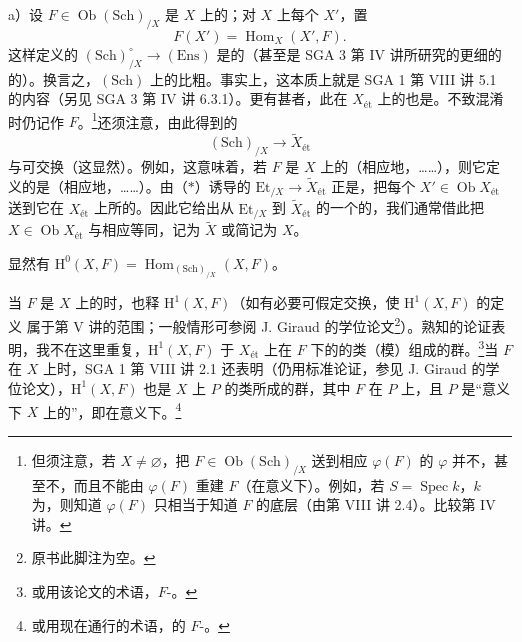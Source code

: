 a）设 $F\in\operatorname{Ob}(\mathrm{Sch})_{/X}$ 是 $X$ 上的；对 $X$ 上每个 $X'$，置
\[
 F(X')=\operatorname{Hom}_X(X',F).
\]
这样定义的 $(\mathrm{Sch})_{/X}^\circ\to(\mathrm{Ens})$ 是的（甚至是 SGA 3 第 IV 讲所研究的更细的 的）。换言之，$(\mathrm{Sch})$ 上的比粗。事实上，这本质上就是 SGA 1 第 VIII 讲 5.1 的内容（另见 SGA 3 第 IV 讲 6.3.1）。更有甚者，此在 $X_{\text{ét}}$ 上的也是。不致混淆时仍记作 $F$。\footnote{但须注意，若 $X\ne\varnothing$，把 $F\in\operatorname{Ob}(\mathrm{Sch})_{/X}$ 送到相应 $\varphi(F)$ 的 $\varphi$ 并不，甚至不，而且不能由 $\varphi(F)$ 重建 $F$（在意义下）。例如，若 $S=\operatorname{Spec}k$，$k$ 为，则知道 $\varphi(F)$ 只相当于知道 $F$ 的底层（由第 VIII 讲 2.4）。比较第 IV 讲。}还须注意，由此得到的
\[
 (\mathrm{Sch})_{/X}\longrightarrow\widetilde X_{\text{ét}}\tag{*}
\]
与可交换（这显然）。例如，这意味着，若 $F$ 是 $X$ 上的（相应地，……），则它定义的是（相应地，……）。由（$*$）诱导的 $\mathrm{Et}_{/X}\to\widetilde X_{\text{ét}}$ 正是，把每个 $X'\in\operatorname{Ob}X_{\text{ét}}$ 送到它在 $X_{\text{ét}}$ 上所的。因此它给出从 $\mathrm{Et}_{/X}$ 到 $\widetilde X_{\text{ét}}$ 的一个的，我们通常借此把 $X\in\operatorname{Ob}X_{\text{ét}}$ 与相应等同，记为 $\widetilde X$ 或简记为 $X$。

显然有 $\mathrm H^0(X,F)=\operatorname{Hom}_{(\mathrm{Sch})_{/X}}(X,F)$。

当 $F$ 是 $X$ 上的时，也释 $\mathrm H^1(X,F)$（如有必要可假定交换，使 $\mathrm H^1(X,F)$ 的定义
属于第 V 讲的范围；一般情形可参阅 J. Giraud 的学位论文\footnote{原书此脚注为空。}）。熟知的论证表明，我不在这里重复，$\mathrm H^1(X,F)$ 于 $X_{\text{ét}}$ 上在 $F$ 下的的类（模）组成的群。\footnote{或用该论文的术语，$F$-。}当 $F$ 在 $X$ 上时，SGA 1 第 VIII 讲 2.1 还表明（仍用标准论证，参见 J. Giraud 的学位论文），$\mathrm H^1(X,F)$ 也是 $X$ 上 $P$ 的类所成的群，其中 $F$ 在 $P$ 上，且 $P$ 是“意义下 $X$ 上的”，即在意义下。\footnote{或用现在通行的术语，的 $F$-。}

